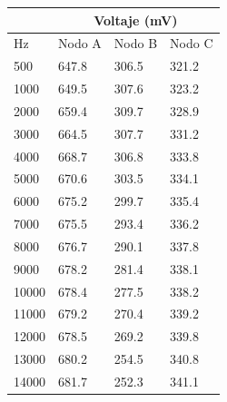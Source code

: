 \begin{table}[H]
\centering
\begin{tabular}{l|lll|}
\cline{2-4}
                            & \multicolumn{3}{c|}{Voltaje (mV)}                                  \\ \hline
\multicolumn{1}{|l|}{Hz}    & \multicolumn{1}{c|}{Nodo A} & \multicolumn{1}{l|}{Nodo B} & Nodo C \\ \hline
\multicolumn{1}{|l|}{500} & \multicolumn{1}{l|}{647.8}  & \multicolumn{1}{l|}{306.5}  & 321.2  \\ \hline
\multicolumn{1}{|l|}{1000}  & \multicolumn{1}{l|}{649.5}  & \multicolumn{1}{l|}{307.6}  & 323.2  \\ \hline
\multicolumn{1}{|l|}{2000}  & \multicolumn{1}{l|}{659.4}  & \multicolumn{1}{l|}{309.7}  & 328.9  \\ \hline
\multicolumn{1}{|l|}{3000}  & \multicolumn{1}{l|}{664.5}  & \multicolumn{1}{l|}{307.7}  & 331.2  \\ \hline
\multicolumn{1}{|l|}{4000}  & \multicolumn{1}{l|}{668.7}  & \multicolumn{1}{l|}{306.8}  & 333.8  \\ \hline
\multicolumn{1}{|l|}{5000}  & \multicolumn{1}{l|}{670.6}  & \multicolumn{1}{l|}{303.5}  & 334.1  \\ \hline
\multicolumn{1}{|l|}{6000}  & \multicolumn{1}{l|}{675.2}  & \multicolumn{1}{l|}{299.7}  & 335.4  \\ \hline
\multicolumn{1}{|l|}{7000}  & \multicolumn{1}{l|}{675.5}  & \multicolumn{1}{l|}{293.4}  & 336.2  \\ \hline
\multicolumn{1}{|l|}{8000}  & \multicolumn{1}{l|}{676.7}  & \multicolumn{1}{l|}{290.1}  & 337.8  \\ \hline
\multicolumn{1}{|l|}{9000}  & \multicolumn{1}{l|}{678.2}  & \multicolumn{1}{l|}{281.4}  & 338.1  \\ \hline
\multicolumn{1}{|l|}{10000} & \multicolumn{1}{l|}{678.4}  & \multicolumn{1}{l|}{277.5}  & 338.2  \\ \hline
\multicolumn{1}{|l|}{11000} & \multicolumn{1}{l|}{679.2}  & \multicolumn{1}{l|}{270.4}  & 339.2  \\ \hline
\multicolumn{1}{|l|}{12000} & \multicolumn{1}{l|}{678.5}  & \multicolumn{1}{l|}{269.2}  & 339.8  \\ \hline
\multicolumn{1}{|l|}{13000} & \multicolumn{1}{l|}{680.2}  & \multicolumn{1}{l|}{254.5}  & 340.8  \\ \hline
\multicolumn{1}{|l|}{14000} & \multicolumn{1}{l|}{681.7}  & \multicolumn{1}{l|}{252.3}  & 341.1  \\ \hline

\end{tabular}
\end{table}
